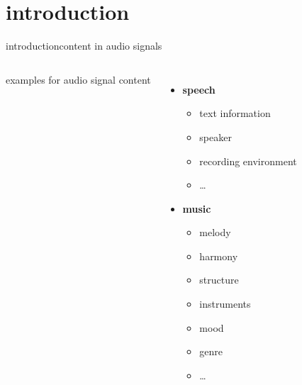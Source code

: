    \section[intro]{introduction}
        \begin{frame}{introduction}{content in audio signals}
             \begin{columns}
                examples for audio signal content
                \begin{itemize}
                    \item   \textbf{speech}
                        \begin{itemize}
                            \item   text information
                            \item   speaker
                            \item   recording environment
                            \item   \dots
                        \end{itemize}
                    \item   \textbf{music}
                        \begin{itemize}
                            \item   melody
                            \item   harmony
                            \item   structure
                            \item   instruments
                            \item   mood
                            \item   genre
                            \item   \dots
                        \end{itemize}
                \end{itemize}
             \end{columns}
        \end{frame}
 
